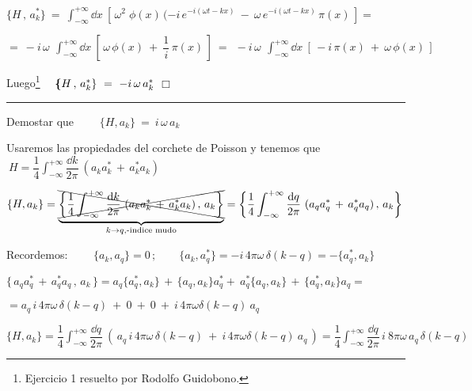 $\displaystyle \{H\, , \, a^*_k\} \ = \ \int_{-\infty}^{+\infty} \dd x\ \left[ \, \omega^2\; \phi(x) \, (-i\, e^{-i(\omega t-kx)} \ - \ \omega\, e^{-i(\omega t-kx)} \, \pi(x) \, \right] = $

$\displaystyle = \ -i\, \omega \, \ \int_{-\infty}^{+\infty} \dd x\ \left[ \, \omega\, \phi(x) \ + \ \dfrac 1 i \, \pi(x) \, \right] \ = \ 
 \ -i\, \omega \, \ \int_{-\infty}^{+\infty} \dd x\ \left[ \, -i\, \pi(x) \ + \ \omega\, \phi(x)  \, \right] $
 
Luego\footnote{Ejercicio 1 resuelto por Rodolfo Guidobono.}  $\quad \boldsymbol \{H \, , \, a_k^*\}  \ = \ -i\, \omega\, a_k^*$ \hspace{11cm} $\Box$


\color{orange}

\vspace{10mm}

\begin{center}\rule{250pt}{0.5pt}\end{center}

\vspace{10mm}


\begin{ejercicio}

Demostar que $ \qquad 	 \{H,a_k\} \ = \ i\, \omega \, a_k $

\end{ejercicio}

\color{MidnightBlue}	

Usaremos las propiedades del corchete de Poisson y tenemos que $\ \displaystyle H=\dfrac 1 4  \int_{-\infty}^{+\infty} \dfrac{\dd k}{2\pi} \ (a_ka_k^*\, + \, a_k^*a_k)$

$\displaystyle \{H,a_k\}= \underbrace{\bcancel{\cancel{ \left\{ \dfrac 1 4  \int_{-\infty}^{+\infty} \dfrac{\dd k}{2\pi} \ (a_ka_k^*\, + \, a_k^*a_k) \, , \, a_k \right\} }}}_{k\to q, \text{-indice mudo}} = 
\left\{ \dfrac 1 4  \int_{-\infty}^{+\infty} \dfrac{\dd q}{2\pi} \ (a_qa_q^*\, + \, a_q^*a_q) \, , \, a_k \right\}$

Recordemos: $\qquad \{a_k,a_q\}=0\, ; \qquad \{a_k,a_q^*\}=-i\, 4\pi \omega\, \delta(k-q) = -\{a_q^*,a_k\}$

$\{\, a_qa_q^*\, + \, a_q^*a_q \, , \, a_k \, \} = a_q\{a^*_q,a_k\} \, + \,       \{a_q,a_k\}a_q^*  + \  a^*_q\{a_q,a_k\}\, + \, \{a_q^*,a_k\}a_q = $

$=a_q	\, i\, 4\pi \omega\, \delta(k-q) \ + \ 0 \ + \ 0 \ + \ i\, 4\pi \omega \delta(k-q)\ a_q$

$\displaystyle \{H,a_k\}=  \dfrac 1 4  \int_{-\infty}^{+\infty} \dfrac{\dd q}{2\pi} \  \left( \, 
a_q	\, i\, 4\pi \omega\, \delta(k-q) \ + \ i\, 4\pi \omega \delta(k-q)\ a_q
\, \right) = \dfrac 1 4  \int_{-\infty}^{+\infty} \dfrac{\dd q}{2\pi} \, i \ 8\pi \omega\, a_q\, \delta(k-q)$

